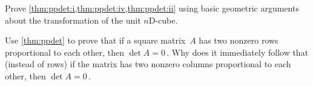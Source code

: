 \begin{exercise}  
Prove \cref{thm:ppdet:i,thm:ppdet:iv,thm:ppdet:ii} using basic geometric arguments about the transformation of the unit \(n\)D-cube.
%
\end{exercise}




\begin{exercise}  
Use \cref{thm:ppdet} to prove that if a square matrix~\(A\) has two nonzero rows proportional to each other, then \(\det A=0\)\,.
Why does it immediately follow that (instead of rows) if the matrix has two nonzero columns proportional to each other, then \(\det A=0\)\,.
\end{exercise}




